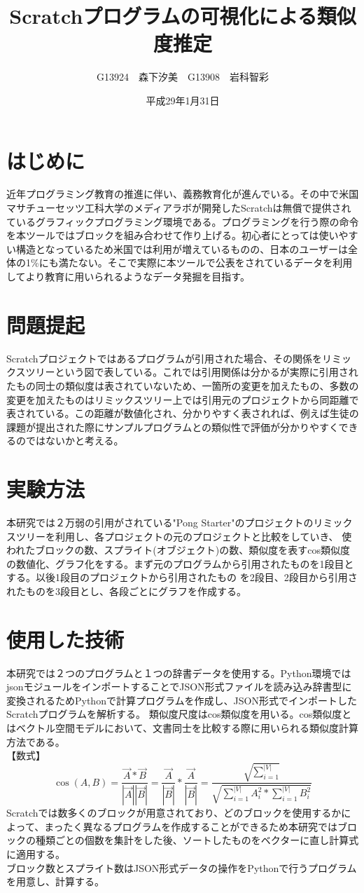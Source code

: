 \documentclass[twocolumn,9pt,a4paper]{jsarticle}
\title{Scratchプログラムの可視化による類似度推定}
\author{G13924　森下汐美　G13908　岩科智彩}
\date{平成29年1月31日}
\begin{document}
\maketitle
%
%
\section{はじめに}
近年プログラミング教育の推進に伴い、義務教育化が進んでいる。その中で米国マサチューセッツ工科大学のメディアラボが開発したScratchは無償で提供されているグラフィックプログラミング環境である。プログラミングを行う際の命令を本ツールではブロックを組み合わせて作り上げる。初心者にとっては使いやすい構造となっているため米国では利用が増えているものの、日本のユーザーは全体の1\%にも満たない。そこで実際に本ツールで公表をされているデータを利用してより教育に用いられるようなデータ発掘を目指す。
\section{問題提起}
Scratchプロジェクトではあるプログラムが引用された場合、その関係をリミックスツリーという図で表している。これでは引用関係は分かるが実際に引用されたもの同士の類似度は表されていないため、一箇所の変更を加えたもの、多数の変更を加えたものはリミックスツリー上では引用元のプロジェクトから同距離で表されている。この距離が数値化され、分かりやすく表されれば、例えば生徒の課題が提出された際にサンプルプログラムとの類似性で評価が分かりやすくできるのではないかと考える。
\section{実験方法}
本研究では２万弱の引用がされている"Pong Starter"のプロジェクトのリミックスツリーを利用し、各プロジェクトの元のプロジェクトと比較をしていき、 使われたブロックの数、スプライト(オブジェクト)の数、類似度を表すcos類似度の数値化、グラフ化をする。まず元のプログラムから引用されたものを1段目とする。以後1段目のプロジェクトから引用されたもの を2段目、2段目から引用されたものを3段目とし、各段ごとにグラフを作成する。
\section{使用した技術}
本研究では２つのプログラムと１つの辞書データを使用する。Python環境ではjsonモジュールをインポートすることでJSON形式ファイルを読み込み辞書型に変換されるためPythonで計算プログラムを作成し、JSON形式でインポートしたScratchプログラムを解析する。
類似度尺度はcos類似度を用いる。cos類似度とはベクトル空間モデルにおいて、文書同士を比較する際に用いられる類似度計算方法である。
\\【数式】
\begin{equation}
\cos(A,B) = \frac{\vec{A} \ast\vec{B}} {|\vec{A}||\vec{B}|}  = \frac{\vec{A}}{|\vec{B}|}\ast\frac{\vec{A}}{|\vec{B}|} = \frac{\sqrt {\sum_{i=1}^{|V|}}}{\sqrt{\sum_{i=1}^{|V|}A_i^2\ast\sum_{i=1}^{|V|}B_i^2}}
\end{equation}
Scratchでは数多くのブロックが用意されており、どのブロックを使用するかによって、まったく異なるプログラムを作成することができるため本研究ではブロックの種類ごとの個数を集計をした後、ソートしたものをベクターに直し計算式に適用する。
\\ブロック数とスプライト数はJSON形式データの操作をPythonで行うプログラムを用意し、計算する。
\end{document}
